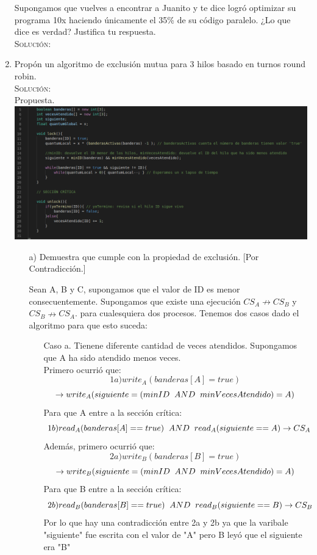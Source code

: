 \documentclass[letterpaper,10pt]{article}
\begin{document}
\begin{enumerate}
    Supongamos que vuelves a encontrar a Juanito y te dice logró optimizar su programa 10x haciendo únicamente el 35\% de su código paralelo. ¿Lo que dice es verdad? Justifica tu respuesta.\\
	
    \textsc{Solución:}
	\\
	
    \item Propón un algoritmo de exclusión mutua para 3 hilos basado en turnos round robin.\\
    \textsc{Solución:}
	\\
	Propuesta.\\
	\includegraphics[width=\textwidth]{EM.png}\\ 
	\begin{itemize}
	\item[a) ] Demuestra que cumple con la propiedad de exclusión.
	[Por Contradicción.]

	Sean A, B y C, supongamos que el valor de ID es menor consecuentemente.
	Supongamos que existe una ejecución $CS_A \nrightarrow CS_B$ y $CS_B \nrightarrow CS_A$.
	para cualesquiera dos procesos. Tenemos dos casos dado el algoritmo para que esto suceda:
	\begin{itemize}
	\item[Caso a. ] Tienene diferente cantidad de veces atendidos. Supongamos que A ha sido atendido menos veces.\\
	Primero ocurrió que:
	\[1a)write_A(banderas[A] = true)\] \[ \rightarrow write_A(siguiente = (minID\hspace{0.2cm}AND \hspace{0.2cm}minVecesAtendido) = A)\]
	Para que A entre a la sección crítica:
	\[1b) read_A(banderas[A] == true)\hspace{0.2cm}AND\hspace{0.2cm}read_A(siguiente == A) \rightarrow CS_A\]
	Además, primero ocurrió que:
	\[2a)write_B(banderas[B] = true)\] \[ \rightarrow write_B(siguiente = (minID\hspace{0.2cm}AND \hspace{0.2cm}minVecesAtendido) = A)\]
	Para que B entre a la sección crítica:
	\[2b) read_B(banderas[B] == true)\hspace{0.2cm}AND\hspace{0.2cm}read_B(siguiente == B) \rightarrow CS_B\]
	Por lo que hay una contradicción entre 2a y 2b ya que la varibale "siguiente" fue escrita con el valor de "A" pero B leyó que el siguiente era "B"


\end{itemize}
\end{itemize}
\end{enumerate}
\end{document}
